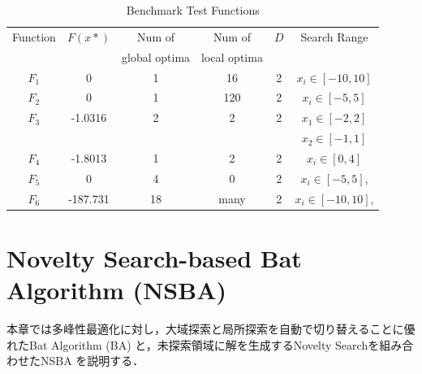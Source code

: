 \documentclass[a4j,11pt]{jarticle}
\begin{document}
\begin{table}[h]
\caption{Benchmark Test Functions}
\begin{center}
\begin{tabular}{c|c|c|c|c|c}
\hline

Function & $F(x*)$ & Num of & Num of & $D$ & Search Range \\
& & global optima & local optima & & \\
\hline
$F_1$ & 0 & 1 & 16 &  2 & $x_i \in [-10,10]$  \\
\hline
$F_2$ & 0 & 1 & 120 & 2 & $x_i \in [-5,5]$  \\
\hline
$F_3$ & -1.0316 & 2 & 2 & 2 & $x_1 \in [-2,2]$  \\
& & & & & $x_2 \in [-1,1]$ \\
\hline
$F_4$ & -1.8013 & 1 & 2 & 2 & $x_i \in [0,4]$  \\
\hline
$F_5$ & 0 & 4 & 0 & 2 & $x_i \in [-5,5]$, \\
\hline
$F_6$ & -187.731 & 18 & many & 2 & $x_i \in [-10,10]$, \\
\hline
\end{tabular}
\label{tab:minMOP}
\end{center}
\end{table}


\FloatBarrier



\clearpage
\newpage
\section{Novelty Search-based Bat Algorithm (NSBA)}
\label{sec:NSBA}

本章では多峰性最適化に対し，大域探索と局所探索を自動で切り替えることに優れたBat Algorithm (BA) と，未探索領域に解を生成するNovelty Searchを組み合わせたNSBA \cite{NSBA} を説明する．
\end{document}
